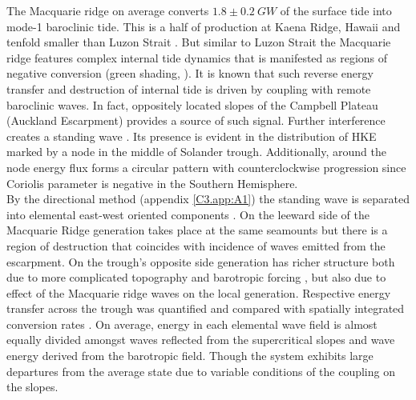 \documentclass[12pt]{article}
\begin{document}
The Macquarie ridge on average converts $1.8 \pm 0.2~GW$ of the surface tide into mode-1 
baroclinic tide. This is a half of production at Kaena Ridge, Hawaii \citep{carter2008energetics} 
and tenfold smaller than Luzon Strait \citep{alford2011energy, kerry2014impact}. But similar to 
Luzon Strait the Macquarie ridge features complex internal tide dynamics that is manifested as 
regions of negative conversion (green shading, ). It is known 
\citep{Kelly2010a} that such reverse energy transfer and destruction of internal tide is driven by 
coupling with remote baroclinic waves. In fact, oppositely located slopes of the Campbell Plateau 
(Auckland Escarpment) provides a source of such signal. Further interference creates a standing 
wave . Its presence is evident in the distribution of HKE marked by a 
node in the middle of Solander trough. Additionally, around the node energy flux forms a circular 
pattern  with counterclockwise progression since Coriolis parameter is 
negative in the Southern Hemisphere.\\

By the directional method (appendix \ref{C3.app:A1}) the standing wave is separated 
into elemental east-west oriented components . On the leeward side 
of the Macquarie Ridge generation takes place at the same seamounts but there is a region of 
destruction that coincides with incidence of waves emitted from the escarpment. On the trough's 
opposite side generation has richer structure both due to more complicated topography and 
barotropic forcing , but also due to effect of the Macquarie ridge waves on 
the local generation. Respective energy transfer across the trough was quantified and compared with 
spatially integrated conversion rates . On average, energy in each 
elemental wave field is almost equally divided amongst waves reflected from the supercritical 
slopes and wave energy derived from the barotropic field. Though the system exhibits large 
departures from the average state due to variable conditions of the coupling on the slopes.\\
\end{document}
